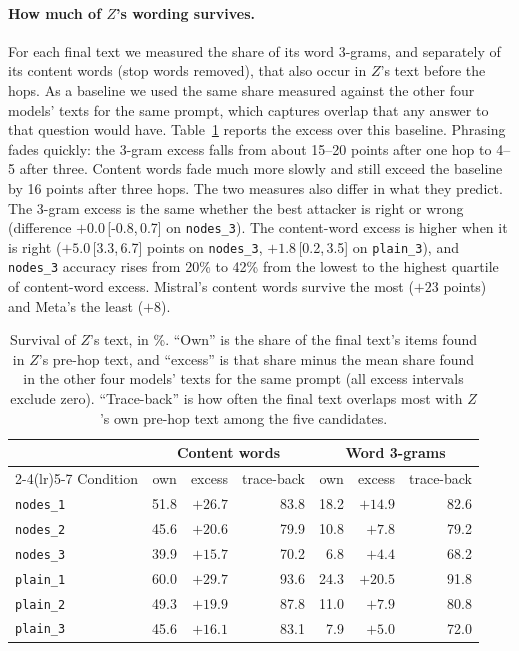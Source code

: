 \documentclass[11pt]{article}
\newcommand{\cond}[1]{\texttt{#1}}
\newcommand{\ci}[2]{\,[#1,\,#2]}
\begin{document}
\paragraph{How much of $Z$'s wording survives.} For each final text we measured the share of its word 3-grams, and separately of its content words (stop words removed), that also occur in $Z$'s text before the hops. As a baseline we used the same share measured against the other four models' texts for the same prompt, which captures overlap that any answer to that question would have. Table~\ref{tab:survival} reports the excess over this baseline. Phrasing fades quickly: the 3-gram excess falls from about 15--20 points after one hop to 4--5 after three. Content words fade much more slowly and still exceed the baseline by 16 points after three hops. The two measures also differ in what they predict. The 3-gram excess is the same whether the best attacker is right or wrong (difference $+0.0$\ci{-0.8}{0.7} on \cond{nodes\_3}). The content-word excess is higher when it is right ($+5.0$\ci{3.3}{6.7} points on \cond{nodes\_3}, $+1.8$\ci{0.2}{3.5} on \cond{plain\_3}), and \cond{nodes\_3} accuracy rises from 20\% to 42\% from the lowest to the highest quartile of content-word excess. Mistral's content words survive the most ($+23$ points) and Meta's the least ($+8$).

\begin{table}[t]
\centering
\small
\begin{tabular}{@{}l rrr rrr@{}}
\toprule
 & \multicolumn{3}{c}{Content words} & \multicolumn{3}{c}{Word 3-grams} \\
\cmidrule(lr){2-4}\cmidrule(lr){5-7}
Condition & own & excess & trace-back & own & excess & trace-back \\
\midrule
\cond{nodes\_1} & 51.8 & $+26.7$ & 83.8 & 18.2 & $+14.9$ & 82.6 \\
\cond{nodes\_2} & 45.6 & $+20.6$ & 79.9 & 10.8 & $+7.8$ & 79.2 \\
\cond{nodes\_3} & 39.9 & $+15.7$ & 70.2 & 6.8 & $+4.4$ & 68.2 \\
\cond{plain\_1} & 60.0 & $+29.7$ & 93.6 & 24.3 & $+20.5$ & 91.8 \\
\cond{plain\_2} & 49.3 & $+19.9$ & 87.8 & 11.0 & $+7.9$ & 80.8 \\
\cond{plain\_3} & 45.6 & $+16.1$ & 83.1 & 7.9 & $+5.0$ & 72.0 \\
\bottomrule
\end{tabular}
\caption{Survival of $Z$'s text, in \%. ``Own'' is the share of the final text's items found in $Z$'s pre-hop text, and ``excess'' is that share minus the mean share found in the other four models' texts for the same prompt (all excess intervals exclude zero). ``Trace-back'' is how often the final text overlaps most with $Z$'s own pre-hop text among the five candidates.}
\label{tab:survival}
\end{table}
\end{document}
